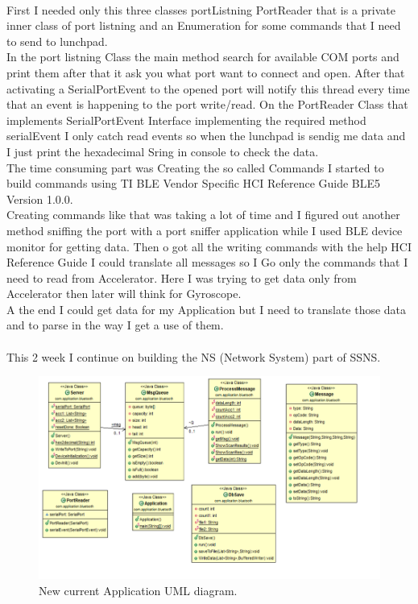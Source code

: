 \documentclass[conference,12pt]{IEEETran}
\begin{document}
\\First I needed only this three classes portListning PortReader that is a private inner class of port listning and an Enumeration for some commands that I need to send to lunchpad.\\
In the port listning Class the main method search for available COM ports and print them after that it ask you what port want to connect and open. After that activating a SerialPortEvent to the opened port will notify this thread every time that an event is happening to the port write/read.
On the PortReader Class that implements SerialPortEvent Interface implementing the required method serialEvent I only catch read events so when the lunchpad is sendig me data and I just print the hexadecimal Sring in console to check the data.\\
The time consuming part was Creating the so called Commands I started to build commands using TI BLE Vendor Specific HCI Reference Guide BLE5 Version 1.0.0.\\
Creating commands like that was taking a lot of time and I figured out another method sniffing the port with a port sniffer application while I used BLE device monitor for getting data.
Then o got all the writing commands with the help HCI Reference Guide I could translate all messages so I Go only the commands that I need to read from Accelerator. Here I was trying to get data only from Accelerator then later will think for Gyroscope.\\
A the end I could get data for my Application but I need to translate those data and to parse in the way I get a use of them.\\\\
This 2 week I continue on building the NS (Network System) part of SSNS.\\
\begin{figure}[!h]
	\centering
	\includegraphics[scale=0.40]{images/UML2.png}
	\caption{New current Application UML diagram.}
	\label{img:UML2}
\end{figure}
\end{document}
